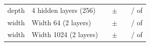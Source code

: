 \begin{tabular}{llrcrc}
depth & 4 hidden layers (256) & \denseParamsDepthFour{} & \denseValAurocMeanDepthFour{} $\pm$ \denseValAurocSdDepthFour{} & \denseDiffMeanDepthFour{} & \denseNSeedsBetterDepthFour{} / \denseNSeedsWorseDepthFour{} of \denseNSeedsComparedDepthFour{} \\
\addlinespace
width & Width 64 (2 layers) & \denseParamsWidthSixFour{} & \denseValAurocMeanWidthSixFour{} $\pm$ \denseValAurocSdWidthSixFour{} & \denseDiffMeanWidthSixFour{} & \denseNSeedsBetterWidthSixFour{} / \denseNSeedsWorseWidthSixFour{} of \denseNSeedsComparedWidthSixFour{} \\
width & Width 1024 (2 layers) & \denseParamsWidthOneZeroTwoFour{} & \denseValAurocMeanWidthOneZeroTwoFour{} $\pm$ \denseValAurocSdWidthOneZeroTwoFour{} & \denseDiffMeanWidthOneZeroTwoFour{} & \denseNSeedsBetterWidthOneZeroTwoFour{} / \denseNSeedsWorseWidthOneZeroTwoFour{} of \denseNSeedsComparedWidthOneZeroTwoFour{} \\
\bottomrule
\end{tabular}
